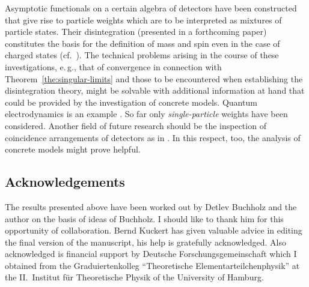 \documentclass[a4paper,a4paper]{article}
\numberwithin{equation}{section}
\theoremstyle{definition}
\theoremstyle{plain}
\theoremstyle{remark}
\begin{document}
  Asymptotic functionals on a certain algebra of detectors have been
  constructed that give rise to particle weights which are to be
  interpreted as mixtures of particle states. Their disintegration
  (presented in a forthcoming paper) constitutes the basis for the
  definition of mass and spin even in the case of charged states
  (cf.~\cite{buchholz/porrmann/stein:1991}). The technical problems
  arising in the course of these investigations, e.\,g., that of
  convergence in connection with Theorem~\ref{the:singular-limits} and
  those to be encountered when establishing the disintegration theory,
  might be solvable with additional information at hand that could be
  provided by the investigation of concrete models. Quantum
  electrodynamics is an example \cite{fredenhagen/freund}. So far only
  \emph{single-particle} weights have been considered. Another field
  of future research should be the inspection of coincidence
  arrangements of detectors as in \cite{araki/haag:1967}. In this
  respect, too, the analysis of concrete models might prove helpful.


  \subsection*{Acknowledgements}

    The results presented above have been worked out by Detlev
    Buchholz and the author on the basis of ideas of Buchholz. I
    should like to thank him for this opportunity of collaboration.
    Bernd Kuckert has given valuable advice in editing the final
    version of the manuscript, his help is gratefully acknowledged.
    Also acknowledged is financial support by Deutsche
    Forschungsgemeinschaft which I obtained from the Graduiertenkolleg
    ``Theoretische Elementarteilchenphysik'' at the II.~Institut f\"ur
    Theoretische Physik of the University of Hamburg.
\end{document}
